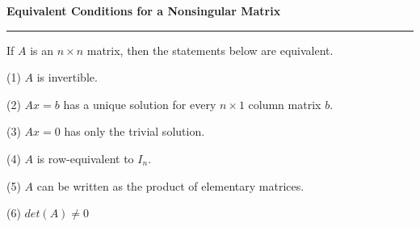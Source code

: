 \nopagenumbers
{\bf Equivalent Conditions for a Nonsingular Matrix}
\vskip 1mm
\hrule

\vskip 6pt
If $A$ is an $n\times n$ matrix, then the statements below are equivalent.

\vskip 6pt
(1) $A$ is invertible.

\vskip 6pt
(2) $Ax=b$ has a unique solution for every $n\times 1$ column matrix $b$.

\vskip 6pt
(3) $Ax=0$ has only the trivial solution.

\vskip 6pt
(4) $A$ is row-equivalent to $I_n$.

\vskip 6pt
(5) $A$ can be written as the product of elementary matrices.

\vskip 6pt
(6) $det(A)\neq 0$

\vfill\eject
\bye
